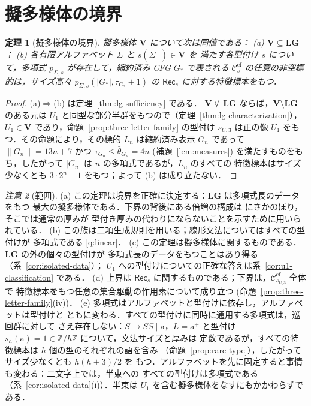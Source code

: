 \documentclass[11pt,a4paper]{ltjsarticle}
\numberwithin{equation}{section}
\theoremstyle{plain}
\newtheorem{theorem}{定理}[section]
\theoremstyle{definition}
\theoremstyle{remark}
\newtheorem{remark}[theorem]{注意}
\theoremstyle{plain}
\newcommand{\cf}{\mathrm{cf}}
\newcommand{\Ccf}[1]{\mathcal C_{#1}^{\cf}}
\newcommand{\Rec}{\mathsf{Rec}}
\newcommand{\LG}{\mathbf{LG}}
\begin{document}
\section{擬多様体の境界}
\label{sec:pseudovariety}

\begin{theorem}[擬多様体の境界]
\label{thm:pseudovariety-boundary}
擬多様体 $\mathbf V$ について次は同値である：
\textup{(a)} $\mathbf V\subseteq\LG$；
\textup{(b)} 各有限アルファベット $\Sigma$ と $s(\Sigma^+)\in\mathbf V$ を
満たす各型付け $s$ について，多項式 $p_{\Sigma,s}$ が存在して，縮約済み
CFG $G_*$ で表される $\Ccf{s}$ の任意の非空標的は，サイズ高々
$p_{\Sigma,s}(|G_*|,\tau_{G_*}+1)$ の $\Rec_s$ に対する特徴標本をもつ．
\end{theorem}

\begin{proof}
(a)$\Rightarrow$(b) は定理~\ref{thm:lg-sufficiency} である．
$\mathbf V\not\subseteq\LG$ ならば，$\mathbf V\setminus\LG$ のある元は
$U_1$ と同型な部分半群をもつので（定理~\ref{thm:lg-characterization}），
$U_1\in\mathbf V$ であり，命題~\ref{prop:three-letter-family} の型付け
$s_{U,3}$ は正の像 $U_1$ をもつ．その命題により，その標的 $L_n$ は縮約済み表示 $G_n$ であって
$\|G_n\|=13n+7$ かつ $\tau_{G_n}\le\bar\theta_{G_n}=4n$
\textup(補題~\ref{lem:measures}\textup) を満たすものをもち，したがって $|G_n|$ は $n$ の多項式であるが，$L_n$ のすべての
特徴標本はサイズ少なくとも $3\cdot2^n-1$ をもつ；よって (b) は成り立たない．
\end{proof}

\begin{remark}[範囲]
\label{rem:scope}
(a) この定理は境界を正確に決定する：$\LG$ は多項式長のデータをもつ
最大の擬多様体である．下界の背後にある倍増の構成は
\cite[命題~6.4]{kuriyamaCFG} にさかのぼり，そこでは通常の厚みが
型付き厚みの代わりにならないことを示すために用いられている．
(b) この族は二項生成規則を用いる；線形文法についてはすべての型付けが
多項式である \ref{q:linear}．
(c) この定理は擬多様体に関するものである．$\LG$ の外の個々の型付けが
多項式長のデータをもつことはあり得る（系~\ref{cor:isolated-data}）；
$U_1$ への型付けについての正確な答えは系~\ref{cor:u1-classification}
である．
(d) 上界は $\Rec_s$ に関するものである；下界は，$\Ccf{s_{U,3}}$ 全体で
特徴標本をもつ任意の集合駆動の作用素について成り立つ
\textup(命題~\ref{prop:three-letter-family}(iv)\textup)．
(e) 多項式はアルファベットと型付けに依存し，アルファベットは型付けと
ともに変わる．すべての型付けに同時に通用する多項式は，巡回群に対して
さえ存在しない：$S\to SS\mid\mathtt a$，$L=\mathtt a^+$ と型付け
$s_h(\mathtt a)=1\in\mathbb Z/h\mathbb Z$ について，文法サイズと厚みは
定数であるが，すべての特徴標本は $h$ 個の型のそれぞれの語を含み
（命題~\ref{prop:rare-type}），したがってサイズ少なくとも $h(h+3)/2$ を
もつ．アルファベットを先に固定すると事情も変わる：二文字上では，半束への
すべての型付けは多項式である（系~\ref{cor:isolated-data}(i)）．半束は
$U_1$ を含む擬多様体をなすにもかかわらずである．
\end{remark}
\end{document}
